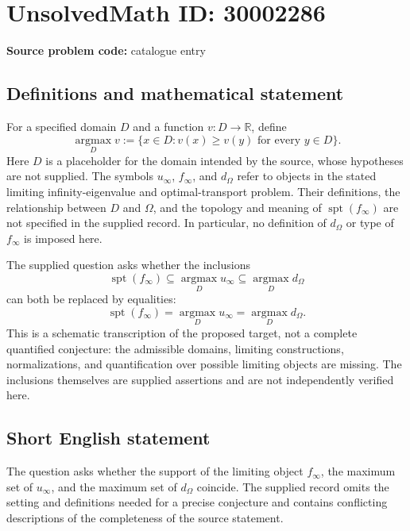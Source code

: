 \documentclass[11pt]{article}
\newcommand{\R}{\mathbb{R}}
\begin{document}
\section*{UnsolvedMath ID: 30002286}
\textbf{Source problem code:} catalogue entry
\subsection{Definitions and mathematical statement}
For a specified domain \(D\) and a function \(v:D\to\R\), define
\[
\operatorname*{argmax}_{D}v
:=\{x\in D: v(x)\geq v(y)\text{ for every }y\in D\}.
\]
Here \(D\) is a placeholder for the domain intended by the source, whose hypotheses are not supplied. The symbols \(u_\infty\), \(f_\infty\), and \(d_\Omega\) refer to objects in the stated limiting infinity-eigenvalue and optimal-transport problem. Their definitions, the relationship between \(D\) and \(\Omega\), and the topology and meaning of \(\operatorname{spt}(f_\infty)\) are not specified in the supplied record. In particular, no definition of \(d_\Omega\) or type of \(f_\infty\) is imposed here.

The supplied question asks whether the inclusions
\[
\operatorname{spt}(f_\infty)
\subseteq \operatorname*{argmax}_{D}u_\infty
\subseteq \operatorname*{argmax}_{D}d_\Omega
\]
can both be replaced by equalities:
\[
\operatorname{spt}(f_\infty)
=\operatorname*{argmax}_{D}u_\infty
=\operatorname*{argmax}_{D}d_\Omega.
\]
This is a schematic transcription of the proposed target, not a complete quantified conjecture: the admissible domains, limiting constructions, normalizations, and quantification over possible limiting objects are missing. The inclusions themselves are supplied assertions and are not independently verified here.
\subsection{Short English statement}
The question asks whether the support of the limiting object \(f_\infty\), the maximum set of \(u_\infty\), and the maximum set of \(d_\Omega\) coincide. The supplied record omits the setting and definitions needed for a precise conjecture and contains conflicting descriptions of the completeness of the source statement.
\end{document}
